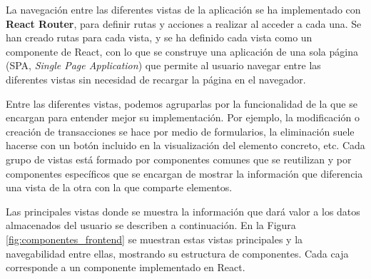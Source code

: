 La navegación entre las diferentes vistas de la aplicación se ha implementado con \textbf{React Router}, para definir rutas y acciones a realizar al acceder a cada una. Se han creado rutas para cada vista, y se ha definido cada vista como un componente de React, con lo que se construye una aplicación de una sola página (SPA, \textit{Single Page Application}) que permite al usuario navegar entre las diferentes vistas sin necesidad de recargar la página en el navegador. 


Entre las diferentes vistas, podemos agruparlas por la funcionalidad de la que se encargan para entender mejor su implementación. Por ejemplo, la modificación o creación de transacciones se hace por medio de formularios, la eliminación suele hacerse con un botón incluido en la visualización del elemento concreto, etc. Cada grupo de vistas está formado por componentes comunes que se reutilizan y por componentes específicos que se encargan de mostrar la información que diferencia una vista de la otra con la que comparte elementos. 


Las principales vistas donde se muestra la información que dará valor a los datos almacenados del usuario se describen a continuación. En la Figura \ref{fig:componentes_frontend} se muestran estas vistas principales y la navegabilidad entre ellas, mostrando su estructura de componentes. Cada caja corresponde a un componente implementado en React.

